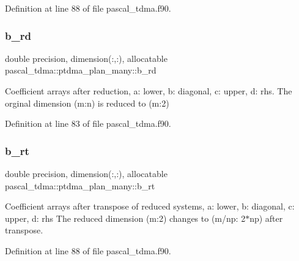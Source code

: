 Definition at line 88 of file pascal\+\_\+tdma.\+f90.

\mbox{\label{structpascal__tdma_1_1ptdma__plan__many_a81ed1b6910c30334e93598f7d18254a3}} 
\subsubsection{\texorpdfstring{b\_rd}{b\_rd}}
{\footnotesize\ttfamily double precision, dimension(\+:,\+:), allocatable pascal\+\_\+tdma\+::ptdma\+\_\+plan\+\_\+many\+::b\+\_\+rd}



Coefficient arrays after reduction, a\+: lower, b\+: diagonal, c\+: upper, d\+: rhs. The orginal dimension (m\+:n) is reduced to (m\+:2) 



Definition at line 83 of file pascal\+\_\+tdma.\+f90.

\mbox{\label{structpascal__tdma_1_1ptdma__plan__many_aab84eff7c823d47acb5388cd4e2a790a}} 
\subsubsection{\texorpdfstring{b\_rt}{b\_rt}}
{\footnotesize\ttfamily double precision, dimension(\+:,\+:), allocatable pascal\+\_\+tdma\+::ptdma\+\_\+plan\+\_\+many\+::b\+\_\+rt}



Coefficient arrays after transpose of reduced systems, a\+: lower, b\+: diagonal, c\+: upper, d\+: rhs The reduced dimension (m\+:2) changes to (m/np\+: 2$\ast$np) after transpose. 



Definition at line 88 of file pascal\+\_\+tdma.\+f90.

\mbox{\label{structpascal__tdma_1_1ptdma__plan__many_a56b15fe2b742c06106a46da7a720d9fd}} 
